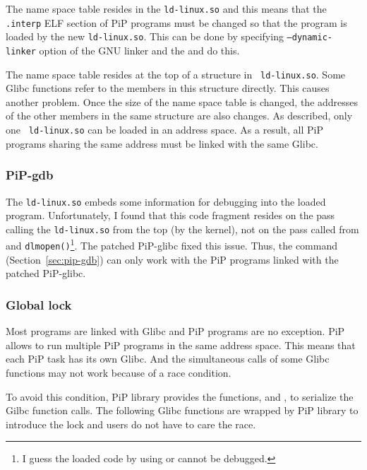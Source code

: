 The name space table resides in the {\tt ld-linux.so} and this means
that the {\tt .interp} ELF section of PiP programs must be changed so
that the program is loaded by the new {\tt ld-linux.so}. This can be
done by specifying {\tt --dynamic-linker} option of the GNU linker and
the  and  do this.

The name space table resides at the top of a structure in {\tt
  ld-linux.so}. Some Glibc functions refer to the members in this
structure directly. This causes another problem. Once the size of the
name space table is changed, the addresses of the other members in the
same structure are also changes. As described, only one {\tt
  ld-linux.so} can be loaded in an address space. As a result, all PiP 
programs sharing the same address must be linked with the same Glibc. 

\subsubsection{PiP-gdb}

The {\tt ld-linux.so} embeds some information for debugging into the
loaded program. Unfortunately, I found that this code fragment
resides on the pass calling the {\tt ld-linux.so} from the
top (by the kernel), not on the pass called from 
  and {\tt dlmopen()}\footnote{I guess the loaded code by using
   or  cannot be debugged.}. The
  patched 
  PiP-glibc fixed this issue. Thus, the  command
  (Section~\ref{sec:pip-gdb}) can only work with 
  the PiP programs linked with the patched PiP-glibc.

\subsubsection{Global lock}

Most programs are linked with Glibc and PiP programs are no
exception. PiP allows to run multiple PiP programs in the same address
space. This means that each PiP task has its own Glibc. And the
simultaneous calls of some Glibc functions may not work because of a
race condition. 

To avoid this condition, PiP library provides the functions,
 and , to 
serialize the Gilbc function calls. The following Glibc functions are
wrapped by PiP library to introduce the lock and users do not have to
care the race. 

